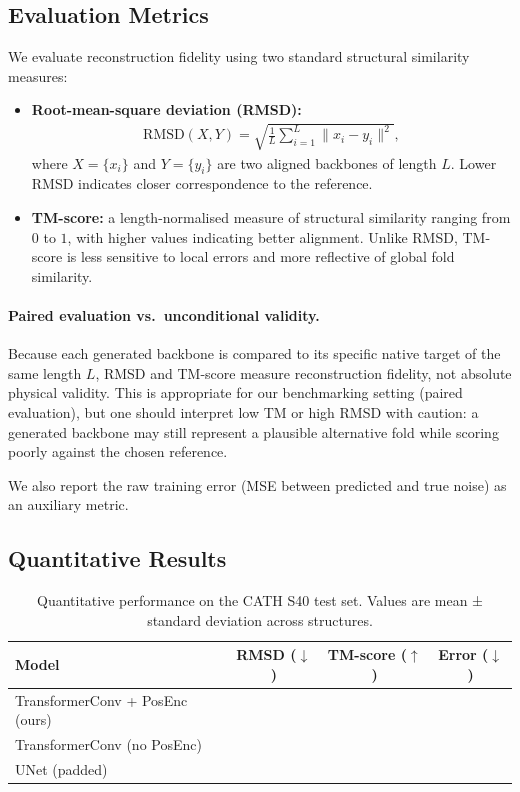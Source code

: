 \documentclass[a4paper,12pt]{article}
\begin{document}
\subsection{Evaluation Metrics}\label{subsec:metrics}
We evaluate reconstruction fidelity using two standard structural similarity measures:
\begin{itemize}
    \item \textbf{Root-mean-square deviation (RMSD):}
        \begin{align*}
            \mathrm{RMSD}(X, Y) = \sqrt{\frac{1}{L}\sum_{i=1}^{L} \|x_i - y_i\|^2},
        \end{align*}
        where \(X=\{x_i\}\) and \(Y=\{y_i\}\) are two aligned backbones of length \(L\). Lower RMSD indicates closer correspondence to the reference.
    \item \textbf{TM-score:} a length-normalised measure of structural similarity ranging from \(0\) to \(1\), with higher values indicating better alignment. Unlike RMSD, TM-score is less sensitive to local errors and more reflective of global fold similarity.
\end{itemize}

\paragraph{Paired evaluation vs.\ unconditional validity.}
Because each generated backbone is compared to its specific native target of the same length \(L\), RMSD and TM-score measure reconstruction fidelity, not absolute physical validity. 
This is appropriate for our benchmarking setting (paired evaluation), but one should interpret low TM or high RMSD with caution: a generated backbone may still represent a plausible alternative fold while scoring poorly against the chosen reference.

We also report the raw training error (MSE between predicted and true noise) as an auxiliary metric.

\subsection{Quantitative Results}\label{subsec:results}

\begin{table}[htbp]
\centering
\caption{Quantitative performance on the CATH S40 test set. Values are mean ± standard deviation across structures.}
\label{tab:results}
\begin{tabular}{lccc}
\hline
Model & RMSD (\(\downarrow\)) & TM-score (\(\uparrow\)) & Error (\(\downarrow\)) \\
\hline
TransformerConv + PosEnc (ours) &   &   &   \\
TransformerConv (no PosEnc)     &   &   &   \\
UNet (padded)                   &   &   &   \\
\hline
\end{tabular}
\end{table}
\end{document}
